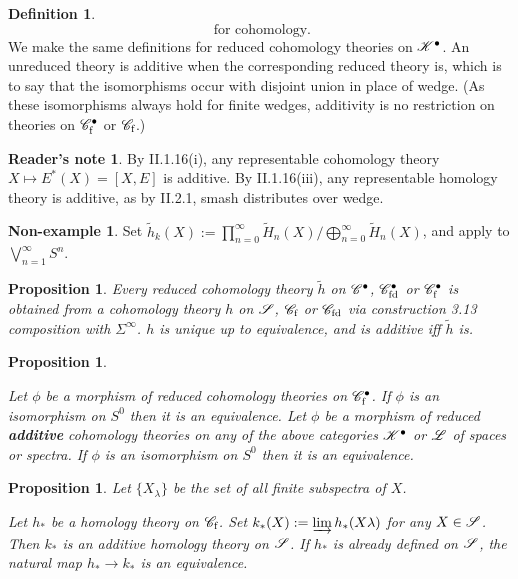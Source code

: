 \documentclass[11pt]{article}
\theoremstyle{plain}
\newtheorem{prop}[thm]{Proposition}
\theoremstyle{definition}
\newtheorem{defn}[thm]{Definition}
\newtheorem*{ReadersNote}{Reader's note}
\newtheorem{nonexample}[thm]{Non-example}
\newcommand{\Specf}{\scrC_\textup{f}}
\newcommand{\Specfd}{\scrC_\textup{fd}}
\begin{document}
{\begin{defn}
\[\text{\ for cohomology}.\]
We make the same definitions for reduced \lparen co\rparen homology theories on
$\mathscr{K}^\bullet$. An unreduced theory is additive when the corresponding reduced
theory is, which is to say that the isomorphisms occur with disjoint union in
place of wedge. (As these isomorphisms always hold for finite wedges, additivity
is no restriction on theories on $\mathscr{C}_\textup{f}^\bullet$ or $\Specf$.)
\end{defn}
\begin{ReadersNote}
By II.1.16(i), any representable cohomology theory $X\mapsto E^*(X)=[X,E]$ is
additive. By II.1.16(iii), any representable homology theory is additive, as by
II.2.1, smash distributes over wedge.
\end{ReadersNote}
\begin{nonexample}
Set $\widetilde h_k(X):=\prod_{n=0}^\infty\widetilde H_n(X)
/\bigoplus_{n=0}^\infty\widetilde H_n(X)$, and apply to 
$\bigvee_{n=1}^\infty S^n$.
\end{nonexample}
\begin{prop}
Every reduced \lparen co\rparen homology theory $\widetilde h$ on
$\mathscr{C}^\bullet$, $\mathscr{C}_\textup{fd}^\bullet$ or $\mathscr{C}_\textup{f}^\bullet$ is
obtained from a \lparen co\rparen homology theory $h$ on $\mathscr{S}$, $\Specf$ or
$\Specfd$ via construction 3.13 \lparen composition with $\Sigma^\infty$\rparen.
$h$ is unique up to equivalence, and is additive iff $\widetilde h$ is.
\end{prop}
\begin{prop}\hfil
\begin{itemise}
\itm[(i)] Let $\phi$ be a morphism of reduced \lparen co\rparen homology
theories on $\mathscr{C}_\textup{f}^\bullet$. If $\phi$ is an isomorphism on $S^0$
then it is an equivalence.
\itm[(ii)] Let $\phi$ be a morphism of reduced \textbf{additive} \lparen
co\rparen homology theories on any of the above categories $\mathscr{K}^\bullet$ or
$\mathscr{L}$ of spaces or spectra. If $\phi$ is an isomorphism on $S^0$ then it is an
equivalence.
\end{itemise}
\end{prop}
\begin{prop}Let $\{X_\lambda\}$ be the set of all finite subspectra of $X$.
\begin{itemise}
\itm[(i)] Let $h_*$ be a homology theory on $\Specf$. Set $k_*(X):=\varinjlim
h_*(X\lambda)$ for any $X\in\mathscr{S}$. Then $k_*$ is an additive homology theory on
$\mathscr{S}$.
\itm[(ii)] If $h_*$ is already defined on $\mathscr{S}$, the natural map $h_*\to k_*$
is an equivalence.

\end{itemise}
\end{prop}}
\end{document}
